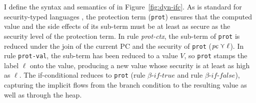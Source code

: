 {%
I define the syntax and semantics of \DynIFC in Figure~\ref{fig:dyn-ifc}. As is
standard for security-typed languages \parencite{heintze1998slam,
  Fennell:2013ab, Toro:2018aa}, the protection term (\texttt{prot}) ensures that
the computed value and the side effects of its sub-term must be at least as
secure as the security level of the protection term. In rule \textit{prot-ctx},
the sub-term of \texttt{prot} is reduced under the join of the current PC and
the security of \texttt{prot} ($\mathit{pc} \curlyvee \ell$). In rule \texttt{prot-val},
the sub-term has been reduced to a value $V$, so \texttt{prot} stamps the label
$\ell$ onto the value, producing a new value whose security is at least as high
as $\ell$. The if-conditional reduces to \texttt{prot} (rule
$\beta\textit{-if-true}$ and rule $\beta\textit{-if-false}$), capturing the
implicit flows from the branch condition to the resulting value as well as
through the heap.

}
